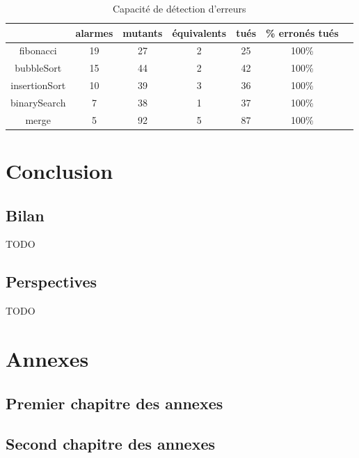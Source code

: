 \documentclass[french]{spimufcphdthesis}
\begin{document}
\begin{table}[t]
  \centering
  \begin{tabular}{|c|c|c|c|c|c|c|}
    \hline
    & alarmes & mutants & équivalents & tués & \% erronés tués \\
    \hline
    fibonacci & 19  & 27 & 2 & 25 & 100\% \\
    \hline
    bubbleSort & 15  & 44 & 2 & 42 & 100\% \\
    \hline
    insertionSort & 10  & 39 & 3 & 36 & 100\% \\
    \hline
    binarySearch & 7 & 38 & 1 & 37 & 100\% \\
    \hline
    merge & 5 & 92 & 5 & 87 & 100\% \\
    \hline
  \end{tabular}
  \label{fig:mutation-exp}
  \caption{Capacité de détection d'erreurs}
\end{table}


\part{Conclusion}


\chapter{Bilan}


TODO


\chapter{Perspectives}


TODO



\backmatter




\listoffigures
\listoftables
\listofdefinitions

\appendix
\part{Annexes}

\chapter{Premier chapitre des annexes}
\chapter{Second chapitre des annexes}
\end{document}
